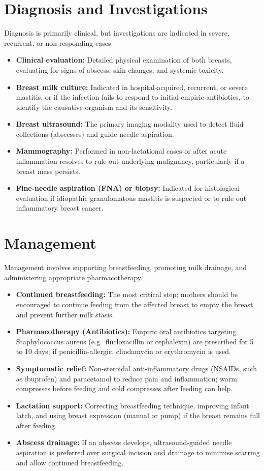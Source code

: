 \section*{Diagnosis and Investigations}
Diagnosis is primarily clinical, but investigations are indicated in severe, recurrent, or non-responding cases.
\begin{itemize}
    \item \textbf{Clinical evaluation:} Detailed physical examination of both breasts, evaluating for signs of abscess, skin changes, and systemic toxicity.
    \item \textbf{Breast milk culture:} Indicated in hospital-acquired, recurrent, or severe mastitis, or if the infection fails to respond to initial empiric antibiotics, to identify the causative organism and its sensitivity.
    \item \textbf{Breast ultrasound:} The primary imaging modality used to detect fluid collections (abscesses) and guide needle aspiration.
    \item \textbf{Mammography:} Performed in non-lactational cases or after acute inflammation resolves to rule out underlying malignancy, particularly if a breast mass persists.
    \item \textbf{Fine-needle aspiration (FNA) or biopsy:} Indicated for histological evaluation if idiopathic granulomatous mastitis is suspected or to rule out inflammatory breast cancer.
\end{itemize}

\section*{Management}
Management involves supporting breastfeeding, promoting milk drainage, and administering appropriate pharmacotherapy.
\begin{itemize}
    \item \textbf{Continued breastfeeding:} The most critical step; mothers should be encouraged to continue feeding from the affected breast to empty the breast and prevent further milk stasis.
    \item \textbf{Pharmacotherapy (Antibiotics):} Empiric oral antibiotics targeting Staphylococcus aureus (e.g.\ flucloxacillin or cephalexin) are prescribed for 5 to 10 days; if penicillin-allergic, clindamycin or erythromycin is used.
    \item \textbf{Symptomatic relief:} Non-steroidal anti-inflammatory drugs (NSAIDs, such as ibuprofen) and paracetamol to reduce pain and inflammation; warm compresses before feeding and cold compresses after feeding can help.
    \item \textbf{Lactation support:} Correcting breastfeeding technique, improving infant latch, and using breast expression (manual or pump) if the breast remains full after feeding.
    \item \textbf{Abscess drainage:} If an abscess develops, ultrasound-guided needle aspiration is preferred over surgical incision and drainage to minimise scarring and allow continued breastfeeding.
\end{itemize}

